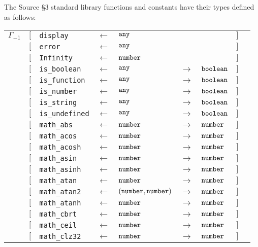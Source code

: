The Source \S 3 standard library functions and constants have their types defined as follows:

\begin{tabular}[fragile]{lllllllll}
$\Gamma_{-1}$
& $[$ & \texttt{display}      & $\leftarrow$  & $\texttt{any}$ & & & $]$ \\
& $[$ & \texttt{error}      & $\leftarrow$  & $\texttt{any}$ & & & $]$ \\
& $[$ & \texttt{Infinity}      & $\leftarrow$  & $\texttt{number}$ & & & $]$ \\
& $[$ & \texttt{is\_boolean}   & $\leftarrow$  & $\texttt{any}$ & $\rightarrow$ & $\texttt{boolean}$ & $]$ \\
& $[$ & \texttt{is\_function}  & $\leftarrow$  & $\texttt{any}$ & $\rightarrow$ & $\texttt{boolean}$ & $]$ \\
& $[$ & \texttt{is\_number}    & $\leftarrow$  & $\texttt{any}$ & $\rightarrow$ & $\texttt{boolean}$ & $]$ \\
& $[$ & \texttt{is\_string}    & $\leftarrow$  & $\texttt{any}$ & $\rightarrow$ & $\texttt{boolean}$ & $]$ \\
& $[$ & \texttt{is\_undefined} & $\leftarrow$  & $\texttt{any}$ & $\rightarrow$ & $\texttt{boolean}$ & $]$ \\
& $[$ & \texttt{math\_abs} & $\leftarrow$  & $\texttt{number}$ & $\rightarrow$ & $\texttt{number}$ & $]$ \\
& $[$ & \texttt{math\_acos} & $\leftarrow$  & $\texttt{number}$ & $\rightarrow$ & $\texttt{number}$ & $]$ \\
& $[$ & \texttt{math\_acosh} & $\leftarrow$  & $\texttt{number}$ & $\rightarrow$ & $\texttt{number}$ & $]$ \\
& $[$ & \texttt{math\_asin} & $\leftarrow$  & $\texttt{number}$ & $\rightarrow$ & $\texttt{number}$ & $]$ \\
& $[$ & \texttt{math\_asinh} & $\leftarrow$  & $\texttt{number}$ & $\rightarrow$ & $\texttt{number}$ & $]$ \\
& $[$ & \texttt{math\_atan} & $\leftarrow$  & $\texttt{number}$ & $\rightarrow$ & $\texttt{number}$ & $]$ \\
& $[$ & \texttt{math\_atan2} & $\leftarrow$  & $(\texttt{number}, \texttt{number})$ & $\rightarrow$ & $\texttt{number}$ & $]$ \\
& $[$ & \texttt{math\_atanh} & $\leftarrow$  & $\texttt{number}$ & $\rightarrow$ & $\texttt{number}$ & $]$ \\
& $[$ & \texttt{math\_cbrt} & $\leftarrow$  & $\texttt{number}$ & $\rightarrow$ & $\texttt{number}$ & $]$ \\
& $[$ & \texttt{math\_ceil} & $\leftarrow$  & $\texttt{number}$ & $\rightarrow$ & $\texttt{number}$ & $]$ \\
& $[$ & \texttt{math\_clz32} & $\leftarrow$  & $\texttt{number}$ & $\rightarrow$ & $\texttt{number}$ & $]$ \\

\end{tabular}
